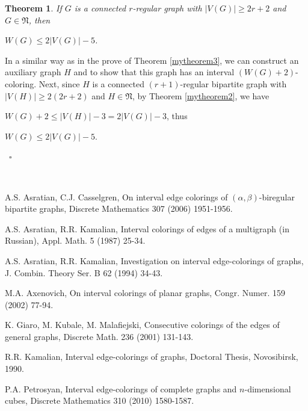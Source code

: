 \documentclass[fleqn,12pt,twoside]{article}
\newtheorem{theorem}{Theorem}
\newenvironment{proof}[1][Proof.]{\begin{trivlist}
\item[\hskip \labelsep {\bfseries #1}]}{\end{trivlist}}
\begin{document}
\begin{theorem}
\label{mytheorem7} If $G$ is a connected $r$-regular graph with
$\vert V(G)\vert \geq 2r+2$ and $G\in \mathfrak{N}$, then
\begin{center}
$W(G)\leq 2\vert V(G)\vert -5$.
\end{center}
\end{theorem}
\begin{proof} In a similar way as in the prove of Theorem
\ref{mytheorem3}, we can construct an auxiliary graph $H$ and to
show that this graph has an interval $(W(G)+2)$-coloring. Next,
since $H$ is a connected $(r+1)$-regular bipartite graph with $\vert
V(H)\vert \geq 2(2r+2)$ and $H\in \mathfrak{N}$, by Theorem
\ref{mytheorem2}, we have
\begin{center}
$W(G)+2\leq \vert V(H)\vert -3 = 2\vert V(G)\vert-3$, thus
\end{center}
\begin{center}
$W(G)\leq 2\vert V(G)\vert-5$.
\end{center}
~$\square$
\end{proof}\


\begin{thebibliography}{99}

 A.S. Asratian, C.J. Casselgren, On interval edge colorings of
$(\alpha,\beta)$-biregular bipartite graphs, Discrete Mathematics
307 (2006) 1951-1956.

 A.S. Asratian, R.R. Kamalian, Interval colorings of edges of a
multigraph (in Russian), Appl. Math. 5 (1987) 25-34.

 A.S. Asratian, R.R. Kamalian, Investigation on interval
edge-colorings of graphs, J. Combin. Theory Ser. B 62 (1994) 34-43.

 M.A. Axenovich, On interval colorings of planar graphs, Congr.
Numer. 159 (2002) 77-94.

 K. Giaro, M. Kubale, M. Malafiejski, Consecutive colorings of
the edges of general graphs, Discrete Math. 236 (2001) 131-143.

 R.R. Kamalian, Interval edge-colorings of graphs, Doctoral
Thesis, Novosibirsk, 1990.

 P.A. Petrosyan, Interval edge-colorings of complete graphs and
$n$-dimensional cubes, Discrete Mathematics 310 (2010) 1580-1587.

\end{thebibliography}
\end{document}
